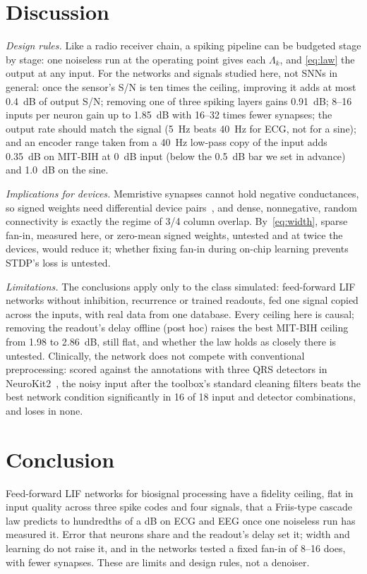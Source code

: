 \documentclass[conference]{IEEEtran}
\newcommand{\dB}{~dB}
\begin{document}
\section{Discussion}
\label{sec:discussion}

\emph{Design rules.} Like a radio receiver chain, a spiking pipeline can be
budgeted stage by stage: one noiseless run at the operating point gives each
$\Lambda_k$, and \eqref{eq:law} the output at any input. For the networks and
signals studied here, not SNNs in general: once the sensor's S/N is ten times
the ceiling, improving it adds at most 0.4\dB{} of output S/N; removing one of
three spiking layers gains 0.91\dB; 8--16 inputs per neuron gain up to
1.85\dB{} with 16--32 times fewer synapses; the output rate should match the
signal (5~Hz beats 40~Hz for ECG, not for a sine); and an encoder range taken
from a 40~Hz low-pass copy of the input adds 0.35\dB{} on MIT-BIH at 0\dB{}
input (below the 0.5\dB{} bar we set in advance) and 1.0\dB{} on the sine.

\emph{Implications for devices.} Memristive synapses cannot hold negative
conductances, so signed weights need differential device
pairs~\cite{prezioso2015training}, and dense, nonnegative, random connectivity
is exactly the regime of 3/4 column overlap. By~\eqref{eq:width}, sparse
fan-in, measured here, or zero-mean signed weights, untested and at twice the
devices, would reduce it; whether fixing fan-in during on-chip learning
prevents STDP's loss is untested.

\emph{Limitations.} The conclusions apply only to the class simulated:
feed-forward LIF networks without inhibition, recurrence or trained readouts,
fed one signal copied across the inputs, with real data from one database.
Every ceiling here is causal; removing the readout's delay offline (post hoc)
raises the best MIT-BIH ceiling from 1.98 to 2.86\dB, still flat, and whether
the law holds as closely there is untested. Clinically, the network does not
compete with conventional preprocessing: scored against the annotations with
three QRS detectors in NeuroKit2~\cite{makowski2021neurokit2}, the noisy input
after the toolbox's standard cleaning filters beats the best network condition
significantly in 16 of 18 input and detector combinations, and loses in none.

\section{Conclusion}

Feed-forward LIF networks for biosignal processing have a fidelity ceiling,
flat in input quality across three spike codes and four signals, that a
Friis-type cascade law predicts to hundredths of a dB on ECG and EEG once one
noiseless run has measured it. Error that neurons share and the readout's
delay set it; width and learning do not raise it, and in the networks tested a
fixed fan-in of 8--16 does, with fewer synapses. These are limits and design
rules, not a denoiser.



\end{document}
